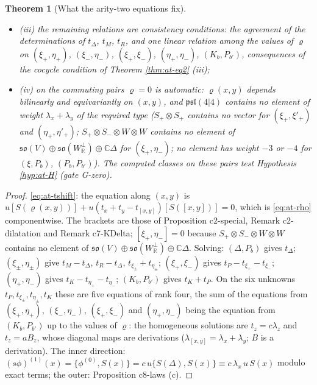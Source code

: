 \documentclass[11pt]{article}
\numberwithin{equation}{section}
\theoremstyle{plain}
\newtheorem{theorem}{Theorem}[section]
\theoremstyle{definition}
\begin{document}
\begin{theorem}[What the arity-two equations fix]
\begin{itemize}
\item (iii) the remaining relations are consistency conditions: the agreement of the determinations of $t_\Delta$, $t_M$, $t_R$, and one linear relation among the values of $\varrho$ on $(\xi_+,\eta_+)$, $(\xi_-,\eta_-)$, $(\xi_+,\xi_-)$, $(\eta_+,\eta_-)$, $(K_b,P_{b'})$, consequences of the cocycle condition of Theorem \ref{thm:at-eq2} (iii);
\item (iv) on the commuting pairs $\varrho=0$ is automatic: $\varrho(x,y)$ depends bilinearly and equivariantly on $(x,y)$, and $\mathfrak{psl}(4|4)$ contains no element of weight $\lambda_x+\lambda_y$ of the required type ($S_+\otimes S_+$ contains no vector for $(\xi_+,\xi'_+)$ and $(\eta_+,\eta'_+)$; $S_+\otimes S_-\otimes W\otimes W$ contains no element of $\mathfrak{so}(V)\oplus\mathfrak{so}(W^\perp_{\mathbb R})\oplus\mathbb C\Delta$ for $(\xi_+,\eta_-)$; no element has weight $-3$ or $-4$ for $(\xi,P_b)$, $(P_b,P_{b'})$). The computed classes on these pairs test Hypothesis \ref{hyp:at-H} (gate G-zero).
\end{itemize}
\end{theorem}

\begin{proof}
\eqref{eq:at-tshift}: the equation along $(x,y)$ is $u[S(\varrho(x,y))]+u(t_x+t_y-t_{[x,y]})[S([x,y])]=0$, which is \eqref{eq:at-rho} componentwise. The brackets are those of Proposition c2-special, Remark c2-dilatation and Remark c7-KDelta; $[\xi_+,\eta_-]=0$ because $S_+\otimes S_-\otimes W\otimes W$ contains no element of $\mathfrak{so}(V)\oplus\mathfrak{so}(W^\perp_{\mathbb R})\oplus\mathbb C\Delta$. Solving: $(\Delta,P_b)$ gives $t_\Delta$; $(\xi_\pm,\eta_\pm)$ give $t_M-t_\Delta$, $t_R-t_\Delta$, $t_{\xi_\pm}+t_{\eta_\pm}$; $(\xi_+,\xi_-)$ gives $t_P-t_{\xi_+}-t_{\xi_-}$; $(\eta_+,\eta_-)$ gives $t_K-t_{\eta_+}-t_{\eta_-}$; $(K_b,P_{b'})$ gives $t_K+t_P$. On the six unknowns $t_P,t_{\xi_\pm},t_{\eta_\pm},t_K$ these are five equations of rank four, the sum of the equations from $(\xi_+,\eta_+)$, $(\xi_-,\eta_-)$, $(\xi_+,\xi_-)$ and $(\eta_+,\eta_-)$ being the equation from $(K_b,P_{b'})$ up to the values of $\varrho$: the homogeneous solutions are $t_z=c\lambda_z$ and $t_z=aB_z$, whose diagonal maps are derivations ($\lambda_{[x,y]}=\lambda_x+\lambda_y$; $B$ is a derivation). The inner direction: $(s\phi)^{(1)}(x)=\{\phi^{(0)},S(x)\}=c\,u\{S(\Delta),S(x)\}\equiv c\,\lambda_x\,u\,S(x)$ modulo exact terms; the outer: Proposition c8-laws (c).
\end{proof}
\end{document}
